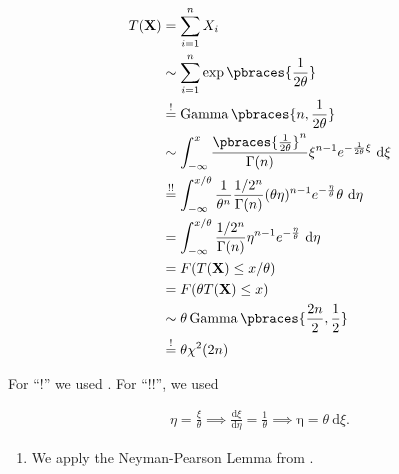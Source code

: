 \begin{solution}
\begin{align*}
    T(\mathbf X)
    & =
    \sum_{i=1}^n
        X_i \\
    & \sim
    \sum_{i=1}^n
        \exp \pbraces{\frac{1}{2 \theta}} \\
    & \stackrel{!}{=}
    \operatorname{Gamma} \pbraces{n, \frac{1}{2 \theta}} \\
    & \sim
    \int_{-\infty}^x
        \frac
        {
            \pbraces{\frac{1}{2 \theta}}^n
        }{
            \Gamma(n)
        }
        \xi^{n-1}
        e^{-\frac{1}{2 \theta} \xi}
        ~ \mathrm d \xi \\
    & \stackrel{!!}{=}
    \int_{-\infty}^{x / \theta}
        \frac{1}{\theta^n}
        \frac{1 / 2^n}{\Gamma(n)}
        (\theta \eta)^{n-1}
        e^{-\frac{\eta}{\theta}}
        \theta
        ~ \mathrm d \eta \\
    & =
    \int_{-\infty}^{x / \theta}
        \frac{1 / 2^n}{\Gamma(n)}
        \eta^{n-1}
        e^{-\frac{\eta}{\theta}}
        ~ \mathrm d \eta \\
    & =
    F(T(\mathbf X) \leq x / \theta) \\
    & =
    F(\theta T(\mathbf X) \leq x) \\
    & \sim
    \theta \operatorname{Gamma} \pbraces{\frac{2 n}{2}, \frac{1}{2}} \\
    & \stackrel{!}{=}
    \theta \chi^2(2 n)
\end{align*}

For \enquote ! we used \cite[section 10, 11]{brand}.
For \enquote{!!}, we used

\begin{align*}
    \eta = \frac{\xi}{\theta}
    \implies
    \frac{\mathrm d \xi}{\mathrm d \eta} = \frac{1}{\theta}
    \implies
    \mathrm \eta = \theta ~ \mathrm d \xi.
\end{align*}

\begin{enumerate}[label = (\alph*)]

    \item We apply the Neyman-Pearson Lemma from \cite[lecture 10, slide 18]{EStat}.
    

\end{enumerate}
\end{solution}
